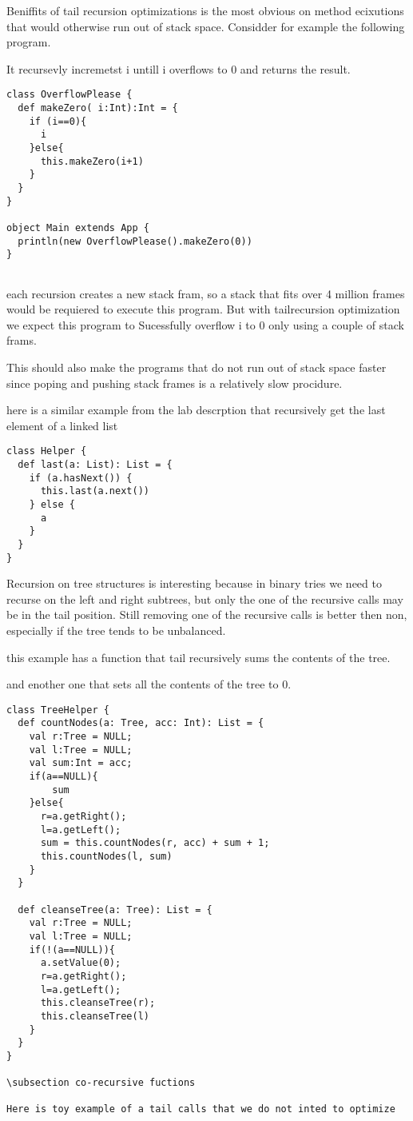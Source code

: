 Beniffits of tail recursion optimizations is the most obvious on method ecixutions that  would otherwise run out of stack space. Considder for example the following program.

It recursevly incremetst i untill i overflows to 0 and returns the result.
\begin{lstlisting}
class OverflowPlease {
  def makeZero( i:Int):Int = {
    if (i==0){
      i
    }else{
      this.makeZero(i+1)
    }
  }
}

object Main extends App {
  println(new OverflowPlease().makeZero(0))
}


\end{lstlisting}
each recursion creates a new stack fram, so a stack that fits over 4 million frames would be requiered to execute this program. But with tailrecursion optimization we expect this program to Sucessfully overflow i to 0 only using a couple of stack frams.

This should also make the programs that do not run out of stack space faster since poping and pushing stack frames is a relatively slow procidure.


here is a similar example from the lab descrption that recursively get the last element of a linked list

\begin{lstlisting}
class Helper {
  def last(a: List): List = {
    if (a.hasNext()) {
      this.last(a.next())
    } else {
      a
    }
  }
}
\end{lstlisting}

Recursion on tree structures is interesting because in binary tries we need to recurse on the left and right subtrees, but only the one of the recursive calls may be in the tail position. Still removing one of the recursive calls is better then non, especially if the tree tends to be unbalanced.

this example has a function that tail recursively sums the contents of the tree.

and enother one that sets all the contents of the tree to 0.
\begin{lstlisting}
class TreeHelper {
  def countNodes(a: Tree, acc: Int): List = {
    val r:Tree = NULL;
    val l:Tree = NULL;
    val sum:Int = acc;
    if(a==NULL){
        sum
    }else{
      r=a.getRight();
      l=a.getLeft();
      sum = this.countNodes(r, acc) + sum + 1;
      this.countNodes(l, sum)
    }
  }
  
  def cleanseTree(a: Tree): List = {
    val r:Tree = NULL;
    val l:Tree = NULL;
    if(!(a==NULL)){
      a.setValue(0);
      r=a.getRight();
      l=a.getLeft();
      this.cleanseTree(r);
      this.cleanseTree(l)
    }
  }
}

\subsection co-recursive fuctions

Here is toy example of a tail calls that we do not inted to optimize

\end{lstlisting}

